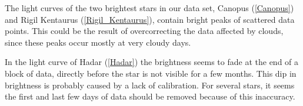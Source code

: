 \documentclass{aa}
\begin{document}
    

The light curves of the two brightest stars in our data set, Canopus (\ref{Canopus}) and Rigil Kentaurus (\ref{Rigil_Kentaurus}), contain bright peaks of scattered data points. This could be the result of overcorrecting the data affected by clouds, since these peaks occur mostly at very cloudy days.

In the light curve of Hadar (\ref{Hadar}) the brightness seems to fade at the end of a block of data, directly before the star is not visible for a few months. This dip in brightness is probably caused by a lack of calibration. For several stars, it seems the first and last few days of data should be removed because of this inaccuracy.
\end{document}

